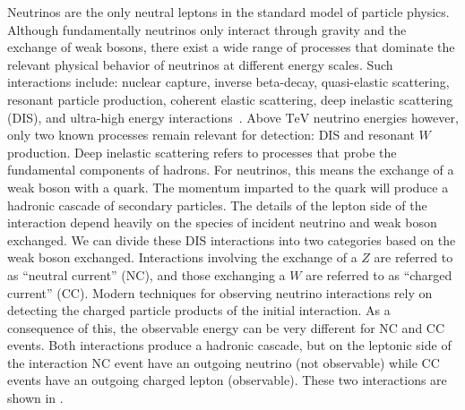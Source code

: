 Neutrinos are the only neutral leptons in the standard model of particle physics.
Although fundamentally neutrinos only interact through gravity and the exchange of weak bosons, there exist a wide range of processes that dominate the relevant physical behavior of neutrinos at different energy scales.
Such interactions include: nuclear capture, inverse beta-decay, quasi-elastic scattering, resonant particle production, coherent elastic scattering, deep inelastic scattering (DIS), and ultra-high energy interactions~\cite{Vannucci:2017rqs,Akimov:2017ade}.
Above $\si\TeV$ neutrino energies however, only two known processes remain relevant for detection: DIS and resonant $W$ production.
Deep inelastic scattering refers to processes that probe the fundamental components of hadrons.
For neutrinos, this means the exchange of a weak boson with a quark.
The momentum imparted to the quark will produce a hadronic cascade of secondary particles.
The details of the lepton side of the interaction depend heavily on the species of incident neutrino and weak boson exchanged.
We can divide these DIS interactions into two categories based on the weak boson exchanged.
Interactions involving the exchange of a $Z$ are referred to as ``neutral current'' (NC), and those exchanging a $W$ are referred to as ``charged current'' (CC).
Modern techniques for observing neutrino interactions rely on detecting the charged particle products of the initial interaction.
As a consequence of this, the observable energy can be very different for NC and CC events.
Both interactions produce a hadronic cascade, but on the leptonic side of the interaction NC event have an outgoing neutrino (not observable) while CC events have an outgoing charged lepton (observable).
These two interactions are shown in .

